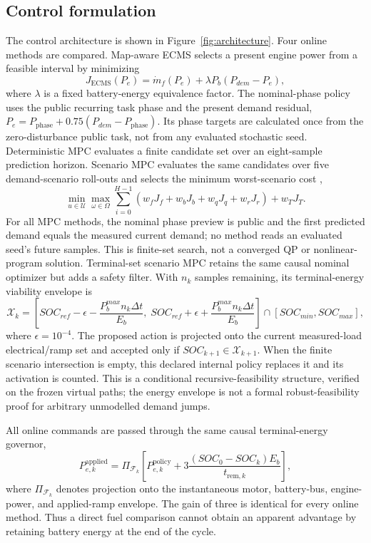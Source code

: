 \documentclass[agriengineering,article,submit,moreauthors]{Definitions/mdpi}
\begin{document}
\subsection{Control formulation}
The control architecture is shown in Figure~\ref{fig:architecture}. Four online methods are compared. Map-aware ECMS selects a present engine power from a feasible interval by minimizing \cite{musardo2005}
\begin{equation}
 J_{\mathrm{ECMS}}(P_e)=\dot m_f(P_e)+\lambda P_{b}(P_{dem}-P_e),
\end{equation}
where $\lambda$ is a fixed battery-energy equivalence factor. The nominal-phase policy uses the public recurring task phase and the present demand residual, $P_e=P_{\mathrm{phase}}+0.75(P_{dem}-P_{\mathrm{phase}})$. Its phase targets are calculated once from the zero-disturbance public task, not from any evaluated stochastic seed. Deterministic MPC evaluates a finite candidate set over an eight-sample prediction horizon. Scenario MPC evaluates the same candidates over five demand-scenario roll-outs and selects the minimum worst-scenario cost \cite{ripaccioli2010},
\begin{equation}
 \min_{u\in\mathcal{U}}\max_{\omega\in\Omega}\sum_{i=0}^{H-1}
 (w_fJ_f+w_bJ_b+w_qJ_q+w_rJ_r)+w_TJ_T.
\end{equation}
For all MPC methods, the nominal phase preview is public and the first predicted demand equals the measured current demand; no method reads an evaluated seed's future samples. This is finite-set search, not a converged QP or nonlinear-program solution. Terminal-set scenario MPC retains the same causal nominal optimizer but adds a safety filter. With $n_k$ samples remaining, its terminal-energy viability envelope is
\begin{equation}
 \mathcal{X}_k=\left[SOC_{ref}-\epsilon-\frac{P_b^{max}n_k\Delta t}{E_b},\;SOC_{ref}+\epsilon+\frac{P_b^{max}n_k\Delta t}{E_b}\right]\cap[SOC_{min},SOC_{max}],
\end{equation}
where $\epsilon=10^{-4}$. The proposed action is projected onto the current measured-load electrical/ramp set and accepted only if $SOC_{k+1}\in\mathcal{X}_{k+1}$. When the finite scenario intersection is empty, this declared internal policy replaces it and its activation is counted. This is a conditional recursive-feasibility structure, verified on the frozen virtual paths; the energy envelope is not a formal robust-feasibility proof for arbitrary unmodelled demand jumps.

All online commands are passed through the same causal terminal-energy governor,
\begin{equation}
 P_{e,k}^{\mathrm{applied}}=\Pi_{\mathcal{F}_k}\left[P_{e,k}^{\mathrm{policy}}+
 3\frac{(SOC_0-SOC_k)E_b}{t_{\mathrm{rem},k}}\right],
\end{equation}
where $\Pi_{\mathcal{F}_k}$ denotes projection onto the instantaneous motor, battery-bus, engine-power, and applied-ramp envelope. The gain of three is identical for every online method. Thus a direct fuel comparison cannot obtain an apparent advantage by retaining battery energy at the end of the cycle.
\end{document}
